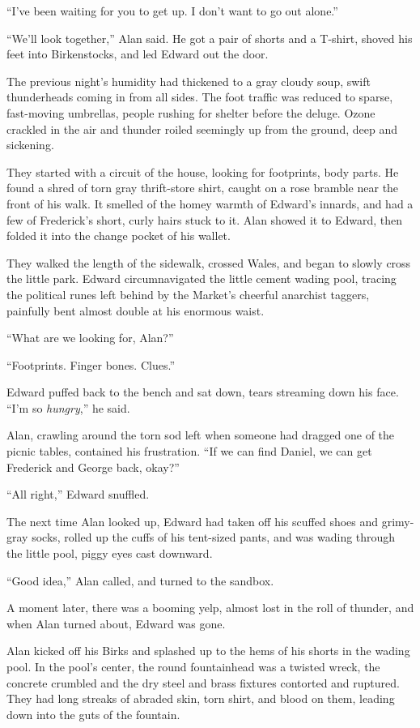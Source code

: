 ``I've been waiting for you to get up.  I don't want to go out
alone.''

``We'll look together,'' Alan said.  He got a pair of shorts and a
T-shirt, shoved his feet into Birkenstocks, and led Edward out the
door.

The previous night's humidity had thickened to a gray cloudy soup,
swift thunderheads coming in from all sides.  The foot traffic was
reduced to sparse, fast-moving umbrellas, people rushing for shelter
before the deluge.  Ozone crackled in the air and thunder roiled
seemingly up from the ground, deep and sickening.

They started with a circuit of the house, looking for footprints, body
parts.  He found a shred of torn gray thrift-store shirt, caught on a
rose bramble near the front of his walk.  It smelled of the homey
warmth of Edward's innards, and had a few of Frederick's short, curly
hairs stuck to it.  Alan showed it to Edward, then folded it into the
change pocket of his wallet.

They walked the length of the sidewalk, crossed Wales, and began to
slowly cross the little park.  Edward circumnavigated the little
cement wading pool, tracing the political runes left behind by the
Market's cheerful anarchist taggers, painfully bent almost double at
his enormous waist.

``What are we looking for, Alan?''

``Footprints.  Finger bones.  Clues.''

Edward puffed back to the bench and sat down, tears streaming down his
face.  ``I'm so \textit{hungry},'' he said.

Alan, crawling around the torn sod left when someone had dragged one
of the picnic tables, contained his frustration.  ``If we can find
Daniel, we can get Frederick and George back, okay?''

``All right,'' Edward snuffled.

The next time Alan looked up, Edward had taken off his scuffed shoes
and grimy-gray socks, rolled up the cuffs of his tent-sized pants, and
was wading through the little pool, piggy eyes cast downward.

``Good idea,'' Alan called, and turned to the sandbox.

A moment later, there was a booming yelp, almost lost in the roll of
thunder, and when Alan turned about, Edward was gone.

Alan kicked off his Birks and splashed up to the hems of his shorts in
the wading pool.  In the pool's center, the round fountainhead was a
twisted wreck, the concrete crumbled and the dry steel and brass
fixtures contorted and ruptured.  They had long streaks of abraded
skin, torn shirt, and blood on them, leading down into the guts of the
fountain.

